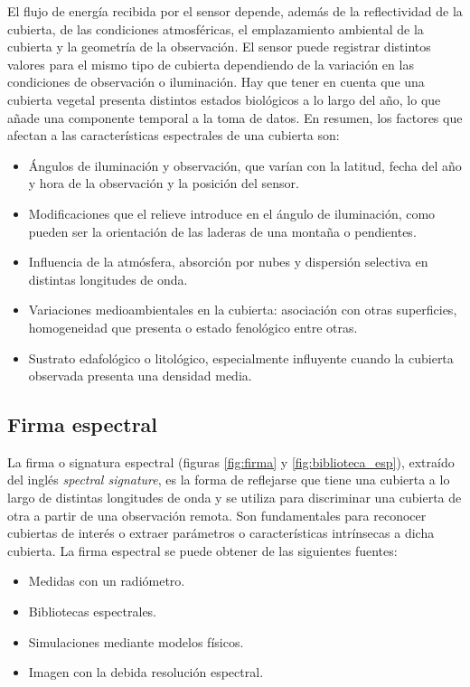El flujo de energía recibida por el sensor depende, además de la reflectividad de la cubierta, de las condiciones atmosféricas, el emplazamiento ambiental de la cubierta y la geometría de la observación. El sensor puede registrar distintos valores para el mismo tipo de cubierta dependiendo de la variación en las condiciones de observación o iluminación. Hay que tener en cuenta que una cubierta vegetal presenta distintos estados biológicos a lo largo del año, lo que añade una componente temporal a la toma de datos. En resumen, los factores que afectan a las características espectrales de una cubierta son:
\begin{itemize}
	\item Ángulos de iluminación y observación, que varían con la latitud, fecha del año y hora de la observación y la posición del sensor.
	\item Modificaciones que el relieve introduce en el ángulo de iluminación, como pueden ser la orientación de las laderas de una montaña o pendientes.
	\item Influencia de la atmósfera, absorción por nubes y dispersión selectiva en distintas longitudes de onda.
	\item Variaciones medioambientales en la cubierta: asociación con otras superficies, homogeneidad que presenta o estado fenológico entre otras.
	\item Sustrato edafológico o litológico, especialmente influyente cuando la cubierta observada presenta una densidad media.
\end{itemize}

\subsection{Firma espectral}
La firma o signatura espectral (figuras \ref{fig:firma} y \ref{fig:biblioteca_esp}), extraído del inglés \textit{spectral signature}, es la forma de reflejarse que tiene una cubierta a lo largo de distintas longitudes de onda y se utiliza para discriminar una cubierta de otra a partir de una observación remota. Son fundamentales para reconocer cubiertas de interés o extraer parámetros o características intrínsecas a dicha cubierta. La firma espectral se puede obtener de las siguientes fuentes:

\begin{itemize}
	\item Medidas con un radiómetro.
	\item Bibliotecas espectrales.
	\item Simulaciones mediante modelos físicos.
	\item Imagen con la debida resolución espectral.
\end{itemize}

